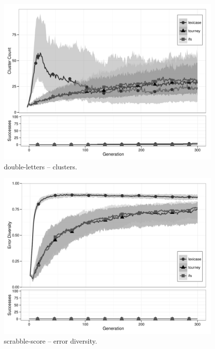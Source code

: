 \begin{figure}%
\centering
\includegraphics[width=11.5cm]{double-letters-cluster.pdf}
\caption{double-letters -- clusters.}
\label{double-lettersClu}
\end{figure}

\begin{figure}%
\centering
\includegraphics[width=11.5cm]{scrabble-score-diversity.pdf}
\caption{scrabble-score -- error diversity.}
\label{scrabble-scoreDiv}
\end{figure}

